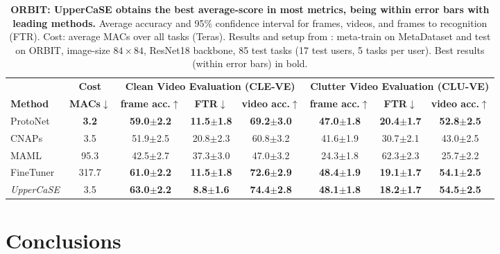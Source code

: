 \documentclass{article}
\begin{document}
\begin{table}[t]
\caption{\textbf{ORBIT: UpperCaSE obtains the best average-score in most metrics, being within error bars with leading methods.}  Average accuracy and 95\% confidence interval for frames, videos, and frames to recognition (FTR). Cost: average MACs over all tasks (Teras). Results and setup from \cite{massiceti2021orbit}: meta-train on MetaDataset and test on ORBIT, image-size $84 \times 84$, ResNet18 backbone, 85 test tasks (17 test users, 5 tasks per user). Best results (within error bars) in bold.}
\vskip 0.1in
\begin{adjustbox}{width=1.0\textwidth,center}
\begin{tabular}{lccccccc}
\toprule
 & \multicolumn{1}{c}{\textbf{Cost}} & \multicolumn{3}{c}{\textbf{Clean Video Evaluation (CLE-VE)}} & \multicolumn{3}{c}{\textbf{Clutter Video Evaluation (CLU-VE)}} \\
 \cmidrule(lr){2-2} \cmidrule(lr){3-5} \cmidrule(lr){6-8}
 \textbf{Method} & \textbf{MACs}$\downarrow$ & \textbf{frame acc.}$\uparrow$ & \textbf{FTR}$\downarrow$ & \textbf{video acc.}$\uparrow$ & \textbf{frame acc.}$\uparrow$ & \textbf{FTR}$\downarrow$  & \textbf{video acc.}$\uparrow$\\
\midrule
ProtoNet & \textbf{3.2} & \textbf{59.0$\pm$2.2} & \textbf{11.5$\pm$1.8} & \textbf{69.2$\pm$3.0} & \textbf{47.0$\pm$1.8} & \textbf{20.4$\pm$1.7} & \textbf{52.8$\pm$2.5}\\
CNAPs & 3.5 & 51.9$\pm$2.5 & 20.8$\pm$2.3 & 60.8$\pm$3.2 & 41.6$\pm$1.9 & 30.7$\pm$2.1 & 43.0$\pm$2.5\\
MAML & 95.3  & 42.5$\pm$2.7 & 37.3$\pm$3.0 & 47.0$\pm$3.2 & 24.3$\pm$1.8 & 62.3$\pm$2.3 & 25.7$\pm$2.2 \\
FineTuner & 317.7 & \textbf{61.0$\pm$2.2} & \textbf{11.5$\pm$1.8} & \textbf{72.6$\pm$2.9} & \textbf{48.4$\pm$1.9} & \textbf{19.1$\pm$1.7} & \textbf{54.1$\pm$2.5} \\
\midrule
\emph{UpperCaSE} & 3.5 & \textbf{63.0$\pm$2.2} & \textbf{8.8$\pm$1.6} & \textbf{74.4$\pm$2.8} & \textbf{48.1$\pm$1.8} & \textbf{18.2$\pm$1.7} & \textbf{54.5$\pm$2.5}\\
\bottomrule
\end{tabular}
\end{adjustbox}
\label{tab:orbit_results}
\end{table}


\section{Conclusions} \label{sec:conclusions}
\end{document}
